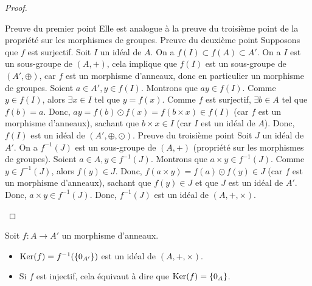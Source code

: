\documentclass[12pt, a4paper]{report}
\begin{document}
\begin{proof}
    \begin{outline}
        \1 Preuve du premier point
            \2 Elle est analogue à la preuve du troisième point de la propriété sur les morphismes de groupes.
        \1 Preuve du deuxième point
            \2 Supposons que $f$ est surjectif. Soit $I$ un idéal de $A$.
            \2 On a $f(I)\subset f(A) \subset A'$.
            \2 On a $I$ est un sous-groupe de $(A,+)$, cela implique que $f(I)$ est un sous-groupe de $(A',\oplus)$, car $f$ est un morphisme d'anneaux, donc en particulier un morphisme de groupes.
            \2 Soient $a\in A', y\in f(I)$. Montrons que $ay \in f(I)$.
                \3 Comme $y \in f(I)$, alors $\exists x \in I$ tel que $y = f(x)$.
                \3 Comme $f$ est surjectif, $\exists b \in A$ tel que $f(b) = a$.
                \3 Donc, $a y = f(b) \odot f(x) = f(b \times x) \in f(I)$ (car $f$ est un morphisme d'anneaux), sachant que $b \times x \in I$ (car $I$ est un idéal de $A$).
            \2 Donc, $f(I)$ est un idéal de $(A',\oplus,\odot)$.
        \1 Preuve du troisième point
            \2 Soit $J$ un idéal de $A'$.
            \2 On a $f^{-1}(J)$ est un sous-groupe de $(A,+)$ (propriété sur les morphismes de groupes).
            \2 Soient $a \in A, y \in f^{-1}(J)$. Montrons que $a \times y \in f^{-1}(J)$.
                \3 Comme $y \in f^{-1}(J)$, alors $f(y) \in J$.
                \3 Donc, $f(a \times y) = f(a) \odot f(y) \in J$ (car $f$ est un morphisme d'anneaux), sachant que $f(y) \in J$ et que $J$ est un idéal de $A'$.
                \3 Donc, $a \times y \in f^{-1}(J)$.
            \2 Donc, $f^{-1}(J)$ est un idéal de $(A,+,\times)$.
    \end{outline}
\end{proof}

\begin{consequence}
    Soit $f:A\to A'$ un morphisme d'anneaux.
    
    \begin{itemize}
        \item $\mathrm{Ker}(f)=f^{-1}(\{0_{A'}\})$ est un idéal de $(A,+,\times)$.

        \item Si $f$ est injectif, cela équivaut à dire que $\mathrm{Ker}(f) = \{0_A\}$.
    \end{itemize}
\end{consequence}
\end{document}

